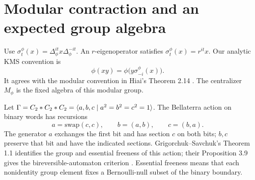 \section{Modular contraction and an expected group algebra}\label{sec:rigidity}
Use $\sigma_t^\phi(x)=\Delta_\phi^{it}x\Delta_\phi^{-it}$. An $r$-eigenoperator satisfies $\sigma_t^\phi(x)=r^{it}x$. Our analytic KMS convention is
\begin{equation}\label{eq:kms}
 \phi(xy)=\phi\bigl(y\sigma_{-i}^\phi(x)\bigr).
\end{equation}
It agrees with the modular convention in Hiai's Theorem 2.14 \cite{Hiai}. The centralizer $M_\phi$ is the fixed algebra of this modular group.

Let $\Gamma=C_2*C_2*C_2=\langle a,b,c\mid a^2=b^2=c^2=1\rangle$. The Bellaterra action on binary words has recursions
\[
 a=\mathrm{swap}(c,c),\qquad b=(a,b),\qquad c=(b,a).
\]
The generator $a$ exchanges the first bit and has section $c$ on both bits; $b,c$ preserve that bit and have the indicated sections. Grigorchuk--Savchuk's Theorem 1.1 identifies the group and essential freeness of this action; their Proposition 3.9 gives the bireversible-automaton criterion \cite{GS}. Essential freeness means that each nonidentity group element fixes a Bernoulli-null subset of the binary boundary.

